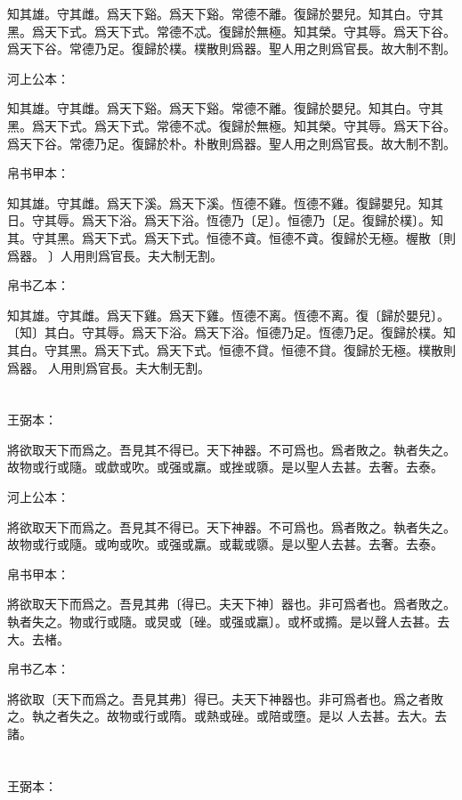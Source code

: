 \documentclass[a5paper]{ctexbook}
\begin{document}
    知其雄。守其雌。爲天下谿。爲天下谿。常德不離。復歸於嬰兒。知其白。守其黑。爲天下式。爲天下式。常德不忒。復歸於無極。知其榮。守其辱。爲天下谷。爲天下谷。常德乃足。復歸於樸。樸散則爲器。聖人用之則爲官長。故大制不割。

    河上公本：

    知其雄。守其雌。爲天下谿。爲天下谿。常德不離。復歸於嬰兒。知其白。守其黑。爲天下式。爲天下式。常德不忒。復歸於無極。知其榮。守其辱。爲天下谷。爲天下谷。常德乃足。復歸於朴。朴散則爲器。聖人用之則爲官長。故大制不割。

    帛书甲本：

    知其雄。守其雌。爲天下溪。爲天下溪。恆德不雞。恆德不雞。復歸嬰兒。知其日。守其辱。爲天下浴。爲天下浴。恆德乃〔足〕。恒德乃〔足。復歸於樸〕。知其。守其黑。爲天下式。爲天下式。恒德不貣。恒德不貣。復歸於无極。楃散〔則爲器。𦔻〕人用則爲官長。夫大制无割。

    帛书乙本：

    知其雄。守其雌。爲天下雞。爲天下雞。恆德不离。恆德不离。復〔歸於嬰兒〕。〔知〕其白。守其辱。爲天下浴。爲天下浴。恒德乃足。恆德乃足。復歸於樸。知其白。守其黑。爲天下式。爲天下式。恒德不貸。恒德不貸。復歸於无極。樸散則爲器。𦔻人用則爲官長。夫大制无割。

    \chapter{}
    王弼本：

    將欲取天下而爲之。吾見其不得已。天下神器。不可爲也。爲者敗之。執者失之。故物或行或隨。或歔或吹。或强或羸。或挫或隳。是以聖人去甚。去奢。去泰。

    河上公本：

    將欲取天下而爲之。吾見其不得已。天下神器。不可爲也。爲者敗之。執者失之。故物或行或隨。或呴或吹。或强或羸。或載或隳。是以聖人去甚。去奢。去泰。

    帛书甲本：

    將欲取天下而爲之。吾見其弗〔得已。夫天下神〕器也。非可爲者也。爲者敗之。執者失之。物或行或隨。或炅或〔䂳。或强或羸〕。或杯或撱。是以聲人去甚。去大。去楮。

    帛书乙本：

    將欲取〔天下而爲之。吾見其弗〕得已。夫天下神器也。非可爲者也。爲之者敗之。執之者失之。故物或行或隋。或熱或䂳。或陪或墮。是以𦔻人去甚。去大。去諸。

    \chapter{}
    王弼本：
\end{document}
